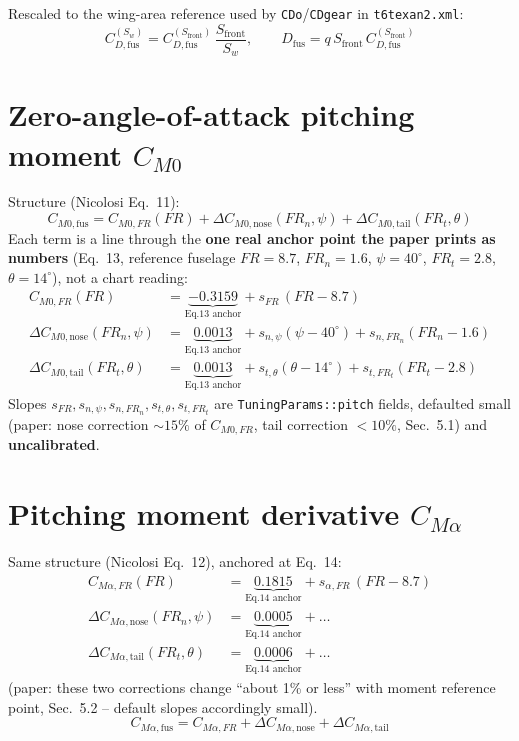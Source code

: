 \documentclass[11pt]{article}
\begin{document}
Rescaled to the wing-area reference used by \texttt{CDo}/\texttt{CDgear}
in \texttt{t6texan2.xml}:
\begin{equation}
C_{D,\text{fus}}^{(S_w)} = C_{D,\text{fus}}^{(S_{\text{front}})}\,\frac{S_{\text{front}}}{S_w},
\qquad
D_{\text{fus}} = q\,S_{\text{front}}\,C_{D,\text{fus}}^{(S_{\text{front}})}
\end{equation}

\section{Zero-angle-of-attack pitching moment $C_{M0}$}
\label{sec:pitch}

Structure (Nicolosi Eq.~11):
\begin{equation}
C_{M0,\text{fus}} = C_{M0,FR}(FR) + \Delta C_{M0,\text{nose}}(FR_n,\psi) + \Delta C_{M0,\text{tail}}(FR_t,\theta)
\end{equation}
Each term is a line through the \textbf{one real anchor point the paper
prints as numbers} (Eq.~13, reference fuselage $FR=8.7$, $FR_n=1.6$,
$\psi=40^\circ$, $FR_t=2.8$, $\theta=14^\circ$), not a chart reading:
\begin{align}
C_{M0,FR}(FR) &= \underbrace{-0.3159}_{\text{Eq.13 anchor}} + s_{FR}\,(FR-8.7) \\
\Delta C_{M0,\text{nose}}(FR_n,\psi) &= \underbrace{0.0013}_{\text{Eq.13 anchor}} + s_{n,\psi}(\psi-40^\circ) + s_{n,FR_n}(FR_n-1.6) \\
\Delta C_{M0,\text{tail}}(FR_t,\theta) &= \underbrace{0.0013}_{\text{Eq.13 anchor}} + s_{t,\theta}(\theta-14^\circ) + s_{t,FR_t}(FR_t-2.8)
\end{align}
Slopes $s_{FR},s_{n,\psi},s_{n,FR_n},s_{t,\theta},s_{t,FR_t}$ are
\texttt{TuningParams::pitch} fields, defaulted small (paper: nose
correction $\sim15\%$ of $C_{M0,FR}$, tail correction $<10\%$,
Sec.~5.1) and \textbf{uncalibrated}.

\section{Pitching moment derivative $C_{M\alpha}$}

Same structure (Nicolosi Eq.~12), anchored at Eq.~14:
\begin{align}
C_{M\alpha,FR}(FR) &= \underbrace{0.1815}_{\text{Eq.14 anchor}} + s_{\alpha,FR}\,(FR-8.7) \\
\Delta C_{M\alpha,\text{nose}}(FR_n,\psi) &= \underbrace{0.0005}_{\text{Eq.14 anchor}} + \ldots \\
\Delta C_{M\alpha,\text{tail}}(FR_t,\theta) &= \underbrace{0.0006}_{\text{Eq.14 anchor}} + \ldots
\end{align}
(paper: these two corrections change ``about 1\% or less'' with moment
reference point, Sec.~5.2 -- default slopes accordingly small).
\begin{equation}
C_{M\alpha,\text{fus}} = C_{M\alpha,FR}+\Delta C_{M\alpha,\text{nose}}+\Delta C_{M\alpha,\text{tail}}
\end{equation}
\end{document}

